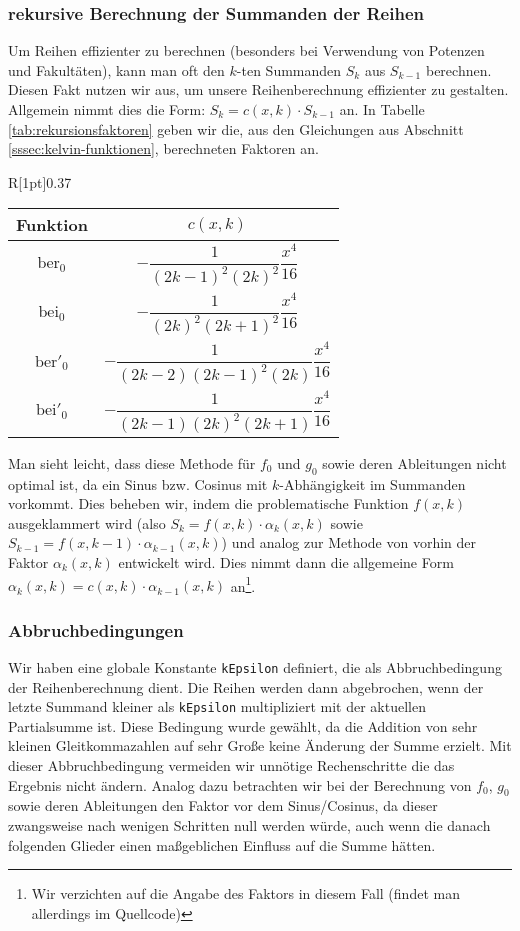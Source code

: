\documentclass[10pt,a4paper]{article}
\begin{document}
\subsubsection{rekursive Berechnung der Summanden der Reihen}
Um Reihen effizienter zu berechnen (besonders bei Verwendung von Potenzen und Fakultäten), kann man oft den $k$-ten Summanden $S_k$ aus $S_{k-1}$ berechnen. Diesen Fakt nutzen wir aus, um unsere Reihenberechnung effizienter zu gestalten. Allgemein nimmt dies die Form: $S_k = c(x, k)\cdot S_{k-1}$ an.
In Tabelle \ref{tab:rekursionsfaktoren} geben wir die, aus den Gleichungen aus Abschnitt \ref{sssec:kelvin-funktionen}, berechneten Faktoren an.
\begin{wraptable}[13]{R}[1pt]{0.37\textwidth}
\begin{tabular}{c|c}
Funktion & $c(x,k)$ \\\hline
\rule[-3.5ex]{0pt}{8ex} $\mathrm{ber}_0$ & $-\dfrac{1}{(2k-1)^2 (2k)^2}\dfrac{x^4}{16}$ \\ \hline
\rule[-3.5ex]{0pt}{8ex} $\mathrm{bei}_0$ & $-\dfrac{1}{(2k)^2 (2k+1)^2}\dfrac{x^4}{16}$ \\ \hline
\rule[-3.5ex]{0pt}{8ex} $\mathrm{ber}'_0$ & $-\dfrac{1}{(2k-2) (2k-1)^2 (2k)}\dfrac{x^4}{16}$ \\ \hline
\rule[-3.5ex]{0pt}{8ex} $\mathrm{bei}'_0$ & $-\dfrac{1}{(2k-1) (2k)^2 (2k+1)}\dfrac{x^4}{16}$
\end{tabular}
\caption{Faktoren der Rekursionsformeln}
\label{tab:rekursionsfaktoren}
\end{wraptable}

Man sieht leicht, dass diese Methode für $f_0$ und $g_0$ sowie deren Ableitungen nicht optimal ist, da ein Sinus bzw. Cosinus mit $k$-Abhängigkeit im Summanden vorkommt.
Dies beheben wir, indem die problematische Funktion $f(x,k)$ ausgeklammert wird (also $S_k = f(x,k) \cdot \alpha_k(x,k)$ sowie $S_{k-1} = f(x,k-1) \cdot \alpha_{k-1}(x,k)$)
und analog zur Methode von vorhin der Faktor $\alpha_k(x,k)$ entwickelt wird. Dies nimmt dann die allgemeine Form $\alpha_k(x,k) = c(x,k)\cdot\alpha_{k-1}(x,k)$ an\footnote{Wir verzichten auf die Angabe des Faktors in diesem Fall (findet man allerdings im Quellcode)}.
\subsubsection{Abbruchbedingungen}
Wir haben eine globale Konstante \texttt{kEpsilon} definiert, die als Abbruchbedingung der Reihenberechnung dient.
Die Reihen werden dann abgebrochen, wenn der letzte Summand kleiner als \texttt{kEpsilon} multipliziert mit der aktuellen Partialsumme ist.
Diese Bedingung wurde gewählt, da die Addition von sehr kleinen Gleitkommazahlen auf sehr Große keine Änderung der Summe erzielt.
Mit dieser Abbruchbedingung vermeiden wir unnötige Rechenschritte die das Ergebnis nicht ändern.
Analog dazu betrachten wir bei der Berechnung von $f_0$, $g_0$ sowie deren Ableitungen den Faktor vor dem Sinus/Cosinus,
da dieser zwangsweise nach wenigen Schritten null werden würde, auch wenn die danach folgenden Glieder einen maßgeblichen Einfluss auf die Summe hätten.
\end{document}
